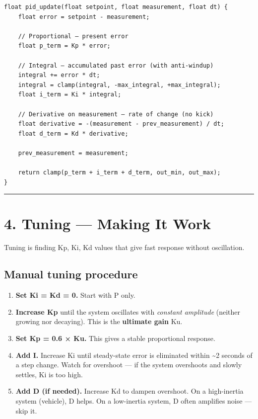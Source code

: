 \documentclass[12pt,a4paper,oneside]{report}
\providecommand{\tightlist}{\setlength{\itemsep}{0pt}\setlength{\parskip}{0pt}}
\begin{document}
\begin{verbatim}
float pid_update(float setpoint, float measurement, float dt) {
    float error = setpoint - measurement;

    // Proportional — present error
    float p_term = Kp * error;

    // Integral — accumulated past error (with anti-windup)
    integral += error * dt;
    integral = clamp(integral, -max_integral, +max_integral);
    float i_term = Ki * integral;

    // Derivative on measurement — rate of change (no kick)
    float derivative = -(measurement - prev_measurement) / dt;
    float d_term = Kd * derivative;

    prev_measurement = measurement;

    return clamp(p_term + i_term + d_term, out_min, out_max);
}
\end{verbatim}

\begin{center}\rule{0.5\linewidth}{0.5pt}\end{center}

\section{4. Tuning --- Making It Work}\label{tuning-making-it-work}

Tuning is finding Kp, Ki, Kd values that give fast response without oscillation.

\subsection{Manual tuning procedure}\label{manual-tuning-procedure}

\begin{enumerate}
\def\labelenumi{\arabic{enumi}.}
\tightlist
\item
  \textbf{Set Ki = Kd = 0.} Start with P only.
\item
  \textbf{Increase Kp} until the system oscillates with \emph{constant
  amplitude} (neither growing nor decaying). This is the \textbf{ultimate gain}
  Ku.
\item
  \textbf{Set Kp = 0.6 × Ku.} This gives a stable proportional response.
\item
  \textbf{Add I.} Increase Ki until steady-state error is eliminated within
  \textasciitilde2 seconds of a step change. Watch for overshoot --- if the
  system overshoots and slowly settles, Ki is too high.
\item
  \textbf{Add D (if needed).} Increase Kd to dampen overshoot. On a high-inertia
  system (vehicle), D helps. On a low-inertia system, D often amplifies noise
  --- skip it.
\end{enumerate}
\end{document}
